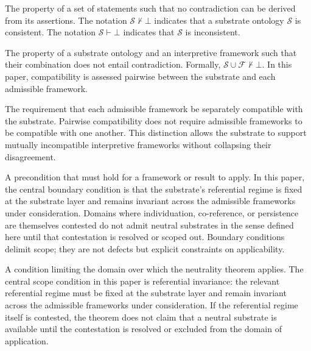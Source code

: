 \begin{description}[style=nextline,leftmargin=1.5cm]

\item[Consistency ($\not\vdash \bot$)]
The property of a set of statements such that
no contradiction can be derived from its assertions.
The notation $\mathcal{S} \not\vdash \bot$
indicates that a substrate ontology $\mathcal{S}$
is consistent.
The notation $\mathcal{S} \vdash \bot$
indicates that $\mathcal{S}$ is inconsistent.

\item[Compatibility]
The property of a substrate ontology
and an interpretive framework such that
their combination does not entail contradiction.
Formally, $\mathcal{S} \cup \mathcal{F} \not\vdash \bot$.
In this paper, compatibility is assessed pairwise
between the substrate and each admissible framework.

\item[Pairwise Compatibility]
The requirement that each admissible framework
be separately compatible with the substrate.
Pairwise compatibility does not require admissible frameworks
to be compatible with one another.
This distinction allows the substrate to support
mutually incompatible interpretive frameworks
without collapsing their disagreement.

\item[Boundary Condition]
A precondition that must hold for a framework or result to apply.
In this paper, the central boundary condition is that
the substrate's referential regime is fixed at the substrate layer
and remains invariant
across the admissible frameworks under consideration.
Domains where individuation, co-reference, or persistence
are themselves contested do not admit neutral substrates
in the sense defined here until that contestation is resolved
or scoped out.
Boundary conditions delimit scope;
they are not defects but explicit constraints on applicability.

\item[Scope Condition]
A condition limiting the domain over which
the neutrality theorem applies.
The central scope condition in this paper is
referential invariance:
the relevant referential regime must be fixed
at the substrate layer
and remain invariant
across the admissible frameworks under consideration.
If the referential regime itself is contested,
the theorem does not claim that a neutral substrate
is available until the contestation is resolved
or excluded from the domain of application.

\end{description}

